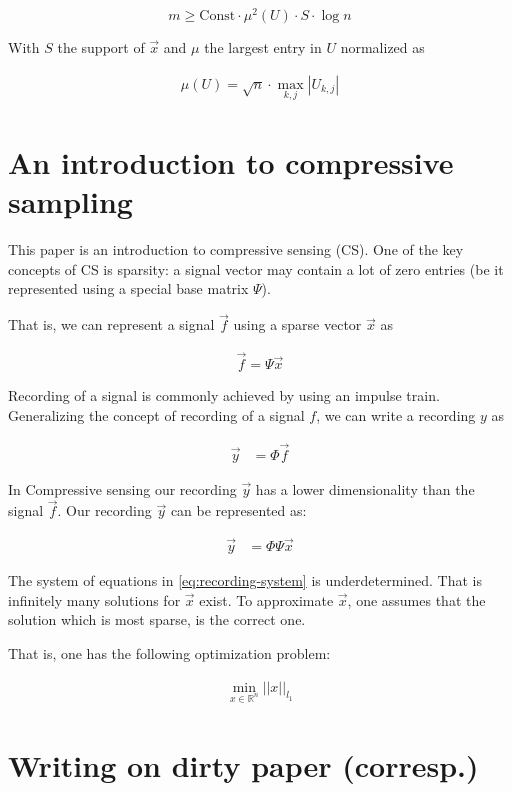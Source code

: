 \documentclass[report, oneside, a4paper, openany]{memoir}
\begin{document}
\begin{equation}
	m \geq \text{Const}\cdot \mu^2(U) \cdot S \cdot \log n
\end{equation}

With $S$ the support of $\vec{x}$ and $\mu$ the largest entry in $U$ normalized as

\begin{align*}
	\mu(U) = \sqrt{n} \cdot \max_{k,j} |U_{k,j}|
\end{align*}
\section{An introduction to compressive sampling \cite{candes2008introduction}}
This paper is an introduction to compressive sensing (CS). One of the key concepts of CS is sparsity: a signal vector may contain a lot of zero entries (be it represented using a special base matrix $\Psi$).

That is, we can represent a signal $\vec{f}$ using a sparse vector $\vec{x}$ as

\begin{align*}
  \vec{f} = \Psi \vec{x}
\end{align*}

Recording of a signal is commonly achieved by using an impulse train. Generalizing the concept of recording of a signal $f$, we can write a recording $y$ as

\begin{align*}
  \vec{y} &= \Phi \vec{f}
\end{align*}

In Compressive sensing our recording $\vec{y}$ has a lower dimensionality than
the signal $\vec{f}$. Our recording $\vec{y}$ can be represented as:

\begin{align}
  \vec{y} &= \Phi \Psi \vec{x}   \label{eq:recording-system}
\end{align}

The system of equations in \ref{eq:recording-system} is underdetermined. That is
infinitely many solutions for $\vec{x}$ exist. To approximate $\vec{x}$, one assumes that the solution which is most sparse, is the correct one.

That is, one has the following optimization problem:

\begin{align*}
  \min_{x \in \mathbb{R}^n} ||x||_{l_1}
\end{align*}
\section{Writing on dirty paper (corresp.) \cite{costa1983writing}}
\end{document}
